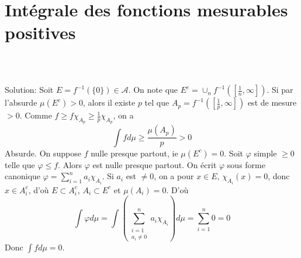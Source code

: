 \documentclass{report}
\begin{document}
\subsection{} 

\subsection{} 

\subsection{} 

\newpage 
\section{Intégrale des fonctions mesurables positives}

\subsection{} \\\\

Solution: \fbox{$\Rightarrow$} Soit $E=f^{-1}(\{0\})\in \mathcal A$. On note que $E^c = \cup_n f^{-1}(\left[ \frac 1n, \infty\right])$. \newline
Si par l'absurde $\mu(E^c)>0$, alors il existe $p$ tel que $A_p=f^{-1}(\left[ \frac 1p,\infty\right])$ est de mesure $>0$. Comme $\displaystyle f\geq f\chi_{A_p}\geq \frac 1p \chi_{A_p}$, on  a $$\int f d\mu \geq \frac{\mu(A_p)}{p}>0$$
Absurde.\newline 
\fbox{$\Leftarrow$} On suppose $f$ nulle presque partout, ie $\mu(E^c)=0$. Soit $\varphi$ simple $\geq 0$ telle que $\varphi\leq f$. Alors $\varphi$ est nulle presque partout. \newline
On écrit $\varphi$ sous forme canonique $\varphi = \sum_{i=1}^n a_i\chi_{A_i}$. Si $a_i$ est $\neq 0$, on a pour $x\in E$, $\chi_{A_i}(x)=0$, donc $x\in A_i^c$, d'où $E\subset A_i^c$, $A_i \subset E^c$ et $\mu(A_i)=0$.\newline 
D'où $$\int \varphi d\mu = \int \left( \sum_{\substack{i=1 \\ a_i \neq 0}}^na_i\chi_{A_i} \right) d\mu = \sum_{i=1}^n 0 = 0$$ \newline
Donc $\int f d\mu = 0$.
\end{document}

